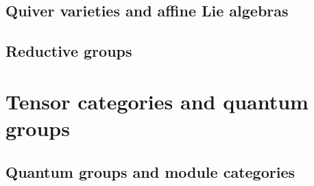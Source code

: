         \chapter{Quiver varieties and affine Lie algebras}
            \begin{abstract}
                
            \end{abstract}
            
            \minitoc
            
            
            
            
            
            
            
        \begin{appendices}
            \chapter{Reductive groups}
                \begin{abstract}
                    
                \end{abstract}
                
                \minitoc
                
                
            
                
                
                
                
                
                
                
        \end{appendices}
    
    \part{Tensor categories and quantum groups}
        \chapter{Quantum groups and module categories}
            \begin{abstract}
                
            \end{abstract}
            
